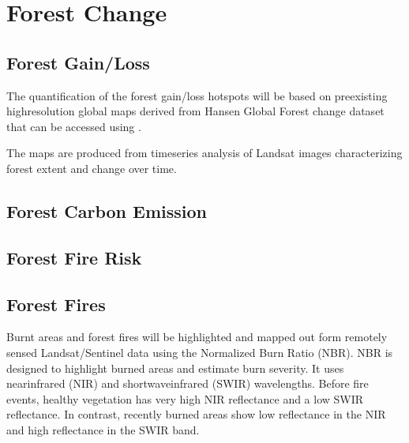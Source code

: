 \documentclass[letterpaper,10pt,english]{sphinxmanual}
\begin{document}
\sphinxstepscope


\chapter{Forest Change}
\label{\detokenize{Background/Forest_change:forest-change}}\label{\detokenize{Background/Forest_change::doc}}

\section{Forest Gain/Loss}
\label{\detokenize{Background/Forest_change:forest-gain-loss}}
\sphinxAtStartPar
The quantification of the forest gain/loss hotspots will be based on pre\sphinxhyphen{}existing high\sphinxhyphen{}resolution global maps derived from Hansen Global Forest change dataset that can be accessed using .
\begin{quote}
\end{quote}

\sphinxAtStartPar
The maps are produced from time\sphinxhyphen{}series analysis of Landsat images characterizing forest extent and change over time.


\section{Forest Carbon Emission}
\label{\detokenize{Background/Forest_change:forest-carbon-emission}}

\section{Forest Fire Risk}
\label{\detokenize{Background/Forest_change:forest-fire-risk}}

\section{Forest Fires}
\label{\detokenize{Background/Forest_change:forest-fires}}
\sphinxAtStartPar
Burnt areas and forest fires will be highlighted and mapped out form remotely sensed Landsat/Sentinel data using the Normalized Burn Ratio (NBR). NBR is designed to highlight burned areas and estimate burn severity. It uses near\sphinxhyphen{}infrared (NIR) and shortwave\sphinxhyphen{}infrared (SWIR) wavelengths. Before fire events, healthy vegetation has very high NIR reflectance and a low SWIR reflectance. In contrast, recently burned areas show low reflectance in the NIR and high reflectance in the SWIR band.
\end{document}
